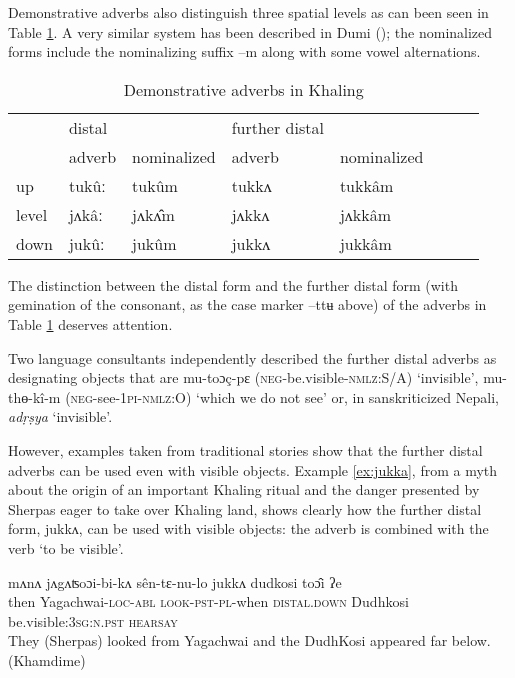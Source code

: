 \documentclass[oldfontcommands,oneside,a4paper,11pt]{article}
\newcommand{\ipa}[1]{{\phon \mbox{#1}}} %
\begin{document}
Demonstrative adverbs also distinguish three spatial levels as can been seen in Table \ref{tab:adv}. A very similar system has been described in Dumi (\citealt[81]{driem93dumi}); the nominalized forms include the nominalizing suffix \ipa{--m} along with some vowel alternations.

\begin{table}[h]
\caption{Demonstrative adverbs in Khaling} \centering \label{tab:adv}
\begin{tabular}{llllllll}
\toprule
	&distal  &	    &	further distal      &	    &	\\
    &	adverb    &	nominalized    &	adverb    &	nominalized    &	\\
    \midrule
up    &	\ipa{tukûː}    &	\ipa{tukûm}    &	\ipa{tukkʌ}    &	\ipa{tukkâm}    &	\\
level    &	\ipa{jʌkâː}    &	\ipa{jʌkʌ̂m}    &	\ipa{jʌkkʌ}    &	\ipa{jʌkkâm}    &	\\
down    &	\ipa{jukûː}    &	\ipa{jukûm}    &	\ipa{jukkʌ}    &	\ipa{jukkâm}    &	\\
\bottomrule
\end{tabular}
\end{table}

The distinction between the distal form and the further distal form (with gemination of the consonant, as the case marker \ipa{--ttʉ} above) of the adverbs in Table \ref{tab:adv} deserves attention.


 Two language consultants   independently described the further distal  adverbs as designating objects that are \ipa{mu-toɔç-pɛ} (\textsc{neg}-be.visible-\textsc{nmlz:S/A}) `invisible', \ipa{mu-thɵ-kî-m} (\textsc{neg}-see-\textsc{1pi-nmlz:O}) `which we do not see' or, in sanskriticized Nepali, \textit{adṛṣya} `invisible'. 
 
  
However, examples taken from traditional stories  show that the further distal adverbs can be used even with visible objects.  Example \ref{ex:jukka}, from a myth about the origin of an important Khaling ritual and the danger presented by Sherpas eager to take over Khaling land, shows clearly how the further distal form,  	\ipa{jukkʌ}, can be used with visible objects: the adverb is combined with the verb ‘to be visible’.



\begin{exe} 
\ex \label{ex:jukka}
\gll     
\ipa{mʌnʌ}  	\ipa{jʌgʌʦoɔi-bi-kʌ}  	\ipa{sên-tɛ-nu-lo}  	\ipa{jukkʌ}  	\ipa{dudkosi}  	\ipa{toɔ̂i}  	\ipa{ʔe}  	\\
then  Yagachwai-\textsc{loc-abl} \textsc{look-pst-pl-}when \textsc{distal.down} Dudhkosi be.visible:\textsc{3sg:n.pst} \textsc{hearsay} \\
\glt They (Sherpas) looked from Yagachwai and  the DudhKosi appeared far below. (Khamdime)
\end{exe}
\end{document}
